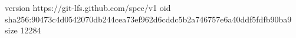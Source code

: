 version https://git-lfs.github.com/spec/v1
oid sha256:90473c4d0542070db244cea73ef962d6cddc5b2a746757e6a40ddf5fdfb90ba9
size 12284
